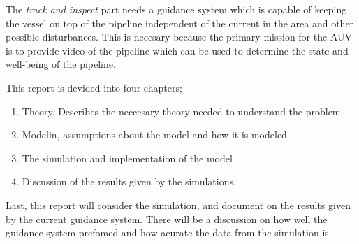 	The \textit{track and inspect} part needs a guidance system which is capable of keeping the vessel on top of the pipeline independent of the current in the area and other possible disturbances. This is necesary because the primary mission for the AUV is to provide video of the pipeline which can be used to determine the state and well-being of the pipeline.
	
	This report is devided into four chapters;
	\begin{enumerate}
	 \item Theory. Describes the neccesary theory needed to understand the problem.
	 \item Modelin, assumptions about the model and how it is modeled
	 \item The simulation and implementation of the model
	 \item Discussion of the results given by the simulations.
	\end{enumerate}

	
	Last, this report will consider the simulation, and document on the results given by the current guidance system. There will be a discussion on how well the guidance system prefomed and how acurate the data from the simulation is. 
	
	
	

